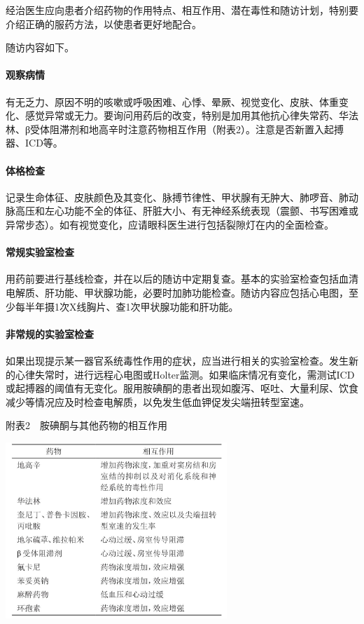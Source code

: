 经治医生应向患者介绍药物的作用特点、相互作用、潜在毒性和随访计划，特别要介绍正确的服药方法，以使患者更好地配合。

随访内容如下。

\paragraph{观察病情}

有无乏力、原因不明的咳嗽或呼吸困难、心悸、晕厥、视觉变化、皮肤、体重变化、感觉异常或无力。要询问用药后的改变，特别是加用其他抗心律失常药、华法林、β受体阻滞剂和地高辛时注意药物相互作用（附表2）。注意是否新置入起搏器、ICD等。

\paragraph{体格检查}

记录生命体征、皮肤颜色及其变化、脉搏节律性、甲状腺有无肿大、肺啰音、肺动脉高压和左心功能不全的体征、肝脏大小、有无神经系统表现（震颤、书写困难或异常步态）。如有视觉变化，应请眼科医生进行包括裂隙灯在内的全面检查。

\paragraph{常规实验室检查}

用药前要进行基线检查，并在以后的随访中定期复查。基本的实验室检查包括血清电解质、肝功能、甲状腺功能，必要时加肺功能检查。随访内容应包括心电图，至少每半年摄1次X线胸片、查1次甲状腺功能和肝功能。

\paragraph{非常规的实验室检查}

如果出现提示某一器官系统毒性作用的症状，应当进行相关的实验室检查。发生新的心律失常时，进行远程心电图或Holter监测。如果临床情况有变化，需测试ICD或起搏器的阈值有无变化。服用胺碘酮的患者出现如腹泻、呕吐、大量利尿、饮食减少等情况应及时检查电解质，以免发生低血钾促发尖端扭转型室速。

附表2　胺碘酮与其他药物的相互作用

\includegraphics[width=3.29167in,height=2.61458in]{./images/Image00578.jpg}

